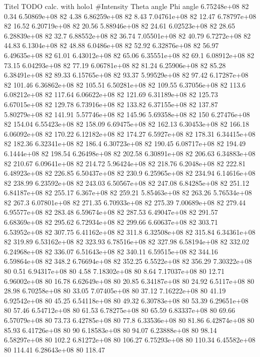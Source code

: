 Titel TODO
calc. with holo1
#Intensity    Theta angle    Phi angle
6.75248e+08 82 0.34
6.50869e+08 82 4.38
6.86259e+08 82 8.43
7.04761e+08 82 12.47
6.78797e+08 82 16.52
6.20719e+08 82 20.56
5.88946e+08 82 24.61
6.02523e+08 82 28.65
6.28839e+08 82 32.7
6.88552e+08 82 36.74
7.05501e+08 82 40.79
6.7272e+08 82 44.83
6.1304e+08 82 48.88
6.0486e+08 82 52.92
6.32876e+08 82 56.97
6.49635e+08 82 61.01
6.43012e+08 82 65.06
6.35551e+08 82 69.1
6.08912e+08 82 73.15
6.04293e+08 82 77.19
6.06781e+08 82 81.24
6.25906e+08 82 85.28
6.38491e+08 82 89.33
6.15765e+08 82 93.37
5.99529e+08 82 97.42
6.17287e+08 82 101.46
6.36862e+08 82 105.51
6.50281e+08 82 109.55
6.37056e+08 82 113.6
6.08212e+08 82 117.64
6.06622e+08 82 121.69
6.31189e+08 82 125.73
6.67015e+08 82 129.78
6.73916e+08 82 133.82
6.37155e+08 82 137.87
5.80279e+08 82 141.91
5.57746e+08 82 145.96
5.69358e+08 82 150
6.27476e+08 82 154.04
6.55423e+08 82 158.09
6.69475e+08 82 162.13
6.30453e+08 82 166.18
6.06092e+08 82 170.22
6.12182e+08 82 174.27
6.5927e+08 82 178.31
6.34415e+08 82 182.36
6.32341e+08 82 186.4
6.30723e+08 82 190.45
6.08717e+08 82 194.49
6.1444e+08 82 198.54
6.26498e+08 82 202.58
6.30891e+08 82 206.63
6.34883e+08 82 210.67
6.09641e+08 82 214.72
5.96424e+08 82 218.76
6.2048e+08 82 222.81
6.48923e+08 82 226.85
6.50437e+08 82 230.9
6.25965e+08 82 234.94
6.14616e+08 82 238.99
6.23592e+08 82 243.03
6.50567e+08 82 247.08
6.84285e+08 82 251.12
6.84187e+08 82 255.17
6.367e+08 82 259.21
5.85463e+08 82 263.26
5.76534e+08 82 267.3
6.07801e+08 82 271.35
6.70933e+08 82 275.39
7.00689e+08 82 279.44
6.95577e+08 82 283.48
6.59674e+08 82 287.53
6.49047e+08 82 291.57
6.68369e+08 82 295.62
6.72934e+08 82 299.66
6.60637e+08 82 303.71
6.53952e+08 82 307.75
6.41162e+08 82 311.8
6.32508e+08 82 315.84
6.34361e+08 82 319.89
6.53162e+08 82 323.93
6.78516e+08 82 327.98
6.58194e+08 82 332.02
6.24968e+08 82 336.07
6.51643e+08 82 340.11
6.59515e+08 82 344.16
6.59864e+08 82 348.2
6.76694e+08 82 352.25
6.5522e+08 82 356.29
7.30322e+08 80 0.51
6.94317e+08 80 4.58
7.18302e+08 80 8.64
7.17037e+08 80 12.71
6.96002e+08 80 16.78
6.62649e+08 80 20.85
6.34187e+08 80 24.92
6.5117e+08 80 28.98
6.70258e+08 80 33.05
7.07405e+08 80 37.12
7.16222e+08 80 41.19
6.92542e+08 80 45.25
6.54118e+08 80 49.32
6.30783e+08 80 53.39
6.29651e+08 80 57.46
6.54712e+08 80 61.53
6.78275e+08 80 65.59
6.83337e+08 80 69.66
6.57079e+08 80 73.73
6.42785e+08 80 77.8
6.33536e+08 80 81.86
6.42874e+08 80 85.93
6.41726e+08 80 90
6.18583e+08 80 94.07
6.23888e+08 80 98.14
6.58297e+08 80 102.2
6.81272e+08 80 106.27
6.75293e+08 80 110.34
6.45582e+08 80 114.41
6.28643e+08 80 118.47
